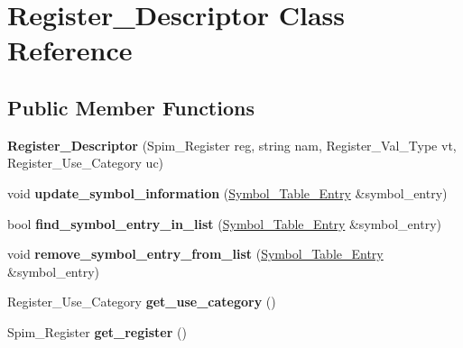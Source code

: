 \hypertarget{classRegister__Descriptor}{}\section{Register\+\_\+\+Descriptor Class Reference}
\label{classRegister__Descriptor}
\subsection*{Public Member Functions}
\begin{DoxyCompactItemize}
\item 
\mbox{\label{classRegister__Descriptor_a4aa35608780cc1d3d8788f16c6eafb9f}} 
{\bfseries Register\+\_\+\+Descriptor} (Spim\+\_\+\+Register reg, string nam, Register\+\_\+\+Val\+\_\+\+Type vt, Register\+\_\+\+Use\+\_\+\+Category uc)
\item 
\mbox{\label{classRegister__Descriptor_a1d54b888a582927ebcaeba0347c90d72}} 
void {\bfseries update\+\_\+symbol\+\_\+information} (\hyperlink{classSymbol__Table__Entry}{Symbol\+\_\+\+Table\+\_\+\+Entry} \&symbol\+\_\+entry)
\item 
\mbox{\label{classRegister__Descriptor_ae32d130d6454fa314bdeca5e2d3106e8}} 
bool {\bfseries find\+\_\+symbol\+\_\+entry\+\_\+in\+\_\+list} (\hyperlink{classSymbol__Table__Entry}{Symbol\+\_\+\+Table\+\_\+\+Entry} \&symbol\+\_\+entry)
\item 
\mbox{\label{classRegister__Descriptor_a8109c85cdde8d1ec651e7079e426c83c}} 
void {\bfseries remove\+\_\+symbol\+\_\+entry\+\_\+from\+\_\+list} (\hyperlink{classSymbol__Table__Entry}{Symbol\+\_\+\+Table\+\_\+\+Entry} \&symbol\+\_\+entry)
\item 
\mbox{\label{classRegister__Descriptor_a766b921e7c4526dede50426c53e9ea12}} 
Register\+\_\+\+Use\+\_\+\+Category {\bfseries get\+\_\+use\+\_\+category} ()
\item 
\mbox{\label{classRegister__Descriptor_abf09227ce7ac7523f3868e0d48c80f6b}} 
Spim\+\_\+\+Register {\bfseries get\+\_\+register} ()
\item 
\mbox{\label{classRegister__Descriptor_a06678f17e2d3bea3e453eaac03bd7af7}} 

\end{DoxyCompactItemize}
